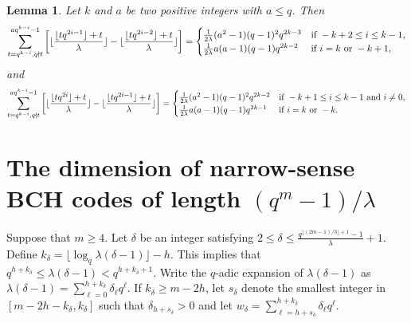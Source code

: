 \documentclass[journal,onecolumn]{IEEEtran}
\newtheorem{lemma}{Lemma}
\begin{document}
\begin{lemma}\label{le5}
Let $k$  and $a$   be two  positive integers with $a\leq q$. Then
\begin{equation}\label{1}
     \sum\limits_{t=q^{k-i},q\nmid t}^{aq^{k-i}-1}\left[\lfloor \frac{\lfloor tq^{2i-1}\rfloor+t}{\lambda}\rfloor -\lfloor \frac{\lfloor tq^{2i-2}\rfloor+t}{\lambda}\rfloor\right]= \begin{cases}
         \frac{1}{2\lambda}(a^2-1)(q-1)^2q^{2k-3} &\hbox{if } -k+2\leq i\leq  k-1,\\
          \frac{1}{2\lambda}a(a-1)(q-1)q^{2k-2} & \hbox{if } i=k \hbox{ or }-k+1,
     \end{cases}
 \end{equation} 
and 
\begin{equation}\label{1.5}
     \sum\limits_{t=q^{k-i},q\nmid t}^{aq^{k-i}-1} \left[\lfloor \frac{\lfloor tq^{2i}\rfloor+t}{\lambda}\rfloor -\lfloor \frac{\lfloor tq^{2i-1}\rfloor+t}{\lambda}\rfloor\right]= \begin{cases}
         \frac{1}{2\lambda}(a^2-1)(q-1)^2q^{2k-2}  &\hbox{if } -k+1\leq i\leq  k-1\hbox{ and }i\neq 0,\\
         \frac{1}{2\lambda}a(a-1)(q-1)q^{2k-1} & \hbox{if } i=k \hbox{ or } -k.
     \end{cases}
 \end{equation} 
\end{lemma}


\section{The dimension of narrow-sense BCH codes of length \texorpdfstring{$(q^m-1)/\lambda$} \ }\label{dim}

 
Suppose that  $m\geq 4$.   Let $\delta$ be an integer satisfying $2\leq \delta\leq  \frac{q^{\lfloor (2m-1)/3\rfloor+1}-1}{\lambda}+1$.   Define $k_{\delta} = \lfloor \log_q \lambda (\delta-1) \rfloor - h$. This implies  that   $q^{h+k_{\delta}}\leq \lambda(\delta-1)<q^{h+k_{\delta}+1}$.  Write the $q$-adic expansion of $\lambda(\delta-1)$ as  $ \lambda(\delta-1)= \sum\limits_{\ell=0}^{h+k_{\delta}}\delta_{\ell}q^{\ell}$.   If $k_{\delta}\geq m-2h$, let  $s_{\delta}$ denote  the smallest integer in $[m-2h-k_{\delta}, k_{\delta}]$ such that $\delta_{h+s_{\delta}}>0$ and let   $w_{\delta}=\sum\limits_{\ell=h+s_{\delta}}^{h+k_{\delta}}\delta_{\ell}q^{\ell}$. 
\end{document}
